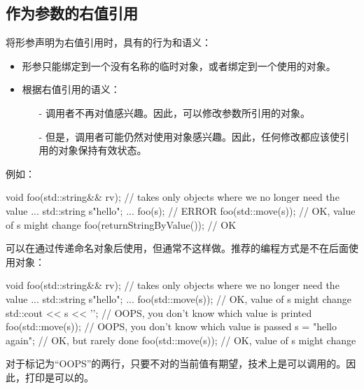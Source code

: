 \subsection{作为参数的右值引用}

将形参声明为右值引用时，具有的行为和语义：

\begin{itemize}
	\item 形参只能绑定到一个没有名称的临时对象，或者绑定到一个使用的对象。
	\item 根据右值引用的语义：
	\begin{itemize}
		\item[-] 调用者不再对值感兴趣。因此，可以修改参数所引用的对象。
		\item[-] 但是，调用者可能仍然对使用对象感兴趣。因此，任何修改都应该使引用的对象保持有效状态。
	\end{itemize}
\end{itemize}

例如：

\begin{cppcode}
void foo(std::string&& rv); // takes only objects where we no longer need the value
...
std::string s{"hello"};
...
foo(s); // ERROR
foo(std::move(s)); // OK, value of s might change
foo(returnStringByValue()); // OK
\end{cppcode}

可以在通过传递命名对象后使用，但通常不这样做。推荐的编程方式是不在后面使用对象：

\begin{cppcode}
void foo(std::string&& rv); // takes only objects where we no longer need the value
...
std::string s{"hello"};
...
foo(std::move(s)); // OK, value of s might change
std::cout << s << '\n'; // OOPS, you don’t know which value is printed
foo(std::move(s)); // OOPS, you don’t know which value is passed
s = "hello again"; // OK, but rarely done
foo(std::move(s)); // OK, value of s might change
\end{cppcode}

对于标记为“OOPS”的两行，只要不对的当前值有期望，技术上是可以调用的。因此，打印是可以的。




